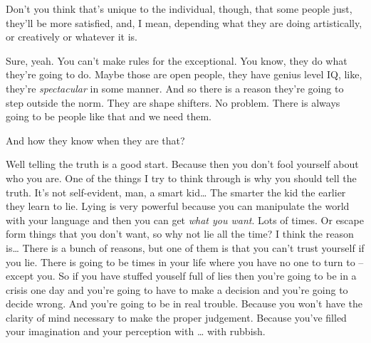 \documentclass{memoir}
\begin{document}
\begin{drama}
		\jrspeaks Don't you think that's unique to the individual, though, that some people just, they'll be more satisfied, and, I mean, depending what they are doing artistically, or creatively or whatever it is.

		\jpspeaks Sure, yeah. You can't make rules for the exceptional. You know, they do what they're going to do. Maybe those are open people, they have genius level IQ, like, they're \emph{spectacular} in some manner. And so there is a reason they're going to step outside the norm. They are shape shifters. No problem. There is always going to be people like that and we need them.

		\jrspeaks And how they know when they are that?

		\jpspeaks Well telling the truth is a good start. Because then you don't fool yourself about who you are. One of the things I try to think through is why you should tell the truth. It's not self-evident, man, a smart kid\ldots{} The smarter the kid the earlier they learn to lie. Lying is very powerful because you can manipulate the world with your language and then you can get \emph{what you want}. Lots of times. Or escape form things that you don't want, so why not lie all the time? I think the reason is\ldots{} There is a bunch of reasons, but one of them is that you can't trust yourself if you lie. There is going to be times in your life where you have no one to turn to -- except you. So if you have stuffed youself full of lies then you're going to be in a crisis one day and you're going to have to make a decision and you're going to decide wrong. And you're going to be in real trouble. Because you won't have the clarity of mind necessary to make the proper judgement. Because you've filled your imagination and your perception with \ldots{} with rubbish.


\end{drama}
\end{document}
